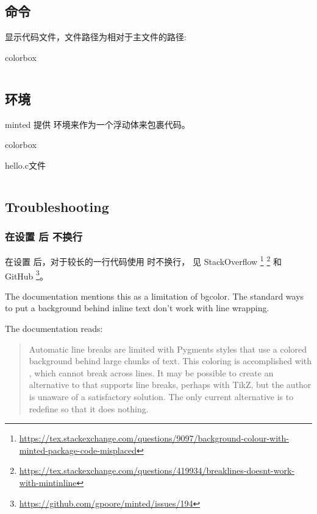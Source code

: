 \subsection{\protect{} 命令}

显示代码文件，文件路径为相对于主文件的路径:

\begin{latexcode}{colorbox}
\inputminted{c}{snippets/codelistings/helloworld.c}
\end{latexcode}

\subsection{\protect{} 环境}

minted 提供  环境来作为一个浮动体来包裹代码。

\begin{latexcode}{colorbox}
\begin{listing}[H]
  \caption{hello.c文件}
  \inputminted{c}{snippets/codelistings/helloworld.c}
\end{listing}
\end{latexcode}

\subsection{Troubleshooting}

\subsubsection{在设置 \protect{} 后 \protect{} 不换行}

在设置  后，对于较长的一行代码使用  时不换行，
见 StackOverflow
\footnote{\url{https://tex.stackexchange.com/questions/9097/background-colour-with-minted-package-code-misplaced}}
\footnote{\url{https://tex.stackexchange.com/questions/419934/breaklines-doesnt-work-with-mintinline}}
和 GitHub
\footnote{\url{https://github.com/gpoore/minted/issues/194}}。

The documentation mentions this as a limitation of bgcolor. The standard ways to put a background behind inline text don't work with line wrapping.

The documentation reads:

\begin{quote}
  Automatic line breaks are limited with Pygments styles that use a colored background behind large chunks of text. This coloring is accomplished with ,
  which cannot break across lines. It may be possible to create an alternative to
   that supports line breaks, perhaps with TikZ, but the author is unaware
  of a satisfactory solution. The only current alternative is to redefine  so
  that it does nothing. 
\end{quote}

